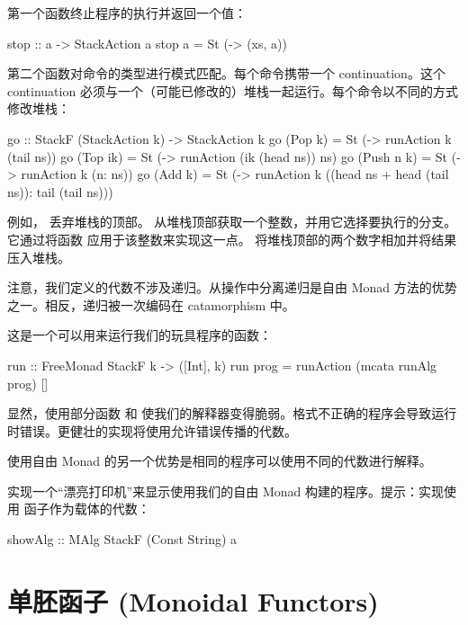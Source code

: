\documentclass[DaoFP]{subfiles}
\begin{document}
    第一个函数终止程序的执行并返回一个值：

    \begin{haskell}
        stop :: a -> StackAction a
        stop a = St (\xs -> (xs, a))
    \end{haskell}

    第二个函数对命令的类型进行模式匹配。每个命令携带一个 continuation。这个 continuation 必须与一个（可能已修改的）堆栈一起运行。每个命令以不同的方式修改堆栈：

    \begin{haskell}
        go :: StackF (StackAction k) -> StackAction k
        go (Pop k)    = St (\ns -> runAction k (tail ns))
        go (Top ik)   = St (\ns -> runAction (ik (head ns)) ns)
        go (Push n k) = St (\ns -> runAction k (n: ns))
        go (Add k)    = St (\ns -> runAction k
        ((head ns + head (tail ns)): tail (tail ns)))
    \end{haskell}

    例如， 丢弃堆栈的顶部。  从堆栈顶部获取一个整数，并用它选择要执行的分支。它通过将函数  应用于该整数来实现这一点。  将堆栈顶部的两个数字相加并将结果压入堆栈。

    注意，我们定义的代数不涉及递归。从操作中分离递归是自由 Monad 方法的优势之一。相反，递归被一次编码在 catamorphism 中。

    这是一个可以用来运行我们的玩具程序的函数：

    \begin{haskell}
        run :: FreeMonad StackF k -> ([Int], k)
        run prog = runAction (mcata runAlg prog) []
    \end{haskell}

    显然，使用部分函数  和  使我们的解释器变得脆弱。格式不正确的程序会导致运行时错误。更健壮的实现将使用允许错误传播的代数。

    使用自由 Monad 的另一个优势是相同的程序可以使用不同的代数进行解释。

    \begin{exercise}
        实现一个“漂亮打印机”来显示使用我们的自由 Monad 构建的程序。提示：实现使用  函子作为载体的代数：

        \begin{haskell}
            showAlg :: MAlg StackF (Const String) a
        \end{haskell}
    \end{exercise}
    \section{单胚函子 (Monoidal Functors)}
\end{document}
